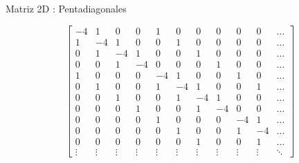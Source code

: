 \documentclass[handout]{beamer}
\begin{document}
\begin{frame}{Matriz 2D : Pentadiagonales}
 
\[
\left[
\begin{array}{cccc|cccc|ccc}
-4 & 1 & 0 & 0 &  1 & 0 & 0 & 0 & 0 & 0 & \dots\\
 1 &-4 & 1 & 0 &  0 & 1 & 0 & 0 & 0 & 0 & \dots\\
 0 & 1 &-4 & 1 &  0 & 0 & 1 & 0 & 0 & 0 & \dots\\
 0 & 0 & 1 &-4 &  0 & 0 & 0 & 1 & 0 & 0 & \dots\\
 \hline
 1 & 0 & 0 & 0 & -4 & 1 & 0 & 0 & 1 & 0 & \dots\\
 0 & 1 & 0 & 0 &  1 &-4 & 1 & 0 & 0 & 1 & \dots\\
 0 & 0 & 1 & 0 &  0 & 1 &-4 & 1 & 0 & 0 & \dots\\
 0 & 0 & 0 & 1 &  0 & 0 & 1 &-4 & 0 & 0 & \dots\\
 \hline
 0 & 0 & 0 & 0 &  1 & 0 & 0 & 0 &-4 & 1 & \dots\\
 0 & 0 & 0 & 0 &  0 & 1 & 0 & 0 & 1 &-4 & \dots\\
 0 & 0 & 0 & 0 &  0 & 0 & 1 & 0 & 0 & 1 & \dots\\
 \vdots & \vdots & \vdots & \vdots & \vdots & \vdots & \vdots & \vdots & \vdots & \vdots & \ddots 
\end{array} \right]
\]

\end{frame}
\end{document}
